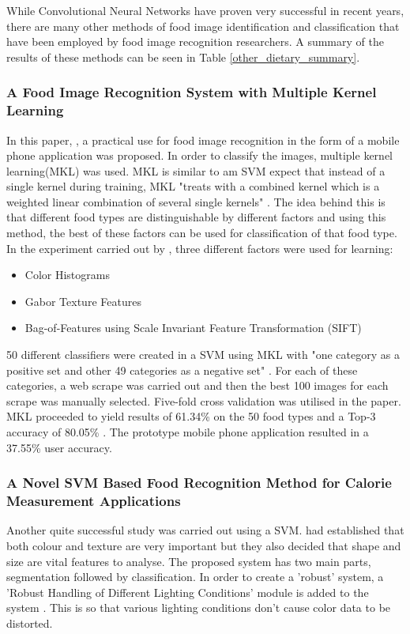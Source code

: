 While Convolutional Neural Networks have proven very successful in recent years, there are many other methods of food image identification and classification that have been employed by food image recognition researchers.
A summary of the results of these methods can be seen in Table \ref{other_dietary_summary}.

\subsubsection*{A Food Image Recognition System with Multiple Kernel Learning}
In this paper, \textcite{kernelLearning}, a practical use for food image recognition in the form of a mobile phone application was proposed. In order to classify the images, multiple kernel learning(MKL) was used. MKL is similar to am SVM expect that instead of a single kernel during training, MKL "treats with a combined kernel which is a weighted linear combination of several single kernels" \textcite{kernelLearning}. The idea behind this is that different food types are distinguishable by different factors and using this method, the best of these factors can be used for classification of that food type. In the experiment carried out by \textcite{kernelLearning}, three different factors were used for learning:
\begin{itemize}
	\item{Color Histograms}
	\item{Gabor Texture Features}
	\item{Bag-of-Features using Scale Invariant Feature Transformation (SIFT)}
\end{itemize}

50 different classifiers were created in a SVM using MKL with "one category as a positive set and other 49 categories as a negative set" \textcite{kernelLearning}. For each of these categories, a web scrape was carried out and then the best 100 images for each scrape was manually selected. Five-fold cross validation was utilised in the paper. MKL proceeded to yield results of 61.34\% on the 50 food types and a Top-3 accuracy of 80.05\% \textcite{kernelLearning}. The prototype mobile phone application resulted in a 37.55\% user accuracy.

\subsubsection*{A Novel SVM Based Food Recognition Method for Calorie Measurement Applications}
Another quite successful study was carried out using a SVM. \textcite{novelSVM} had established that both colour and texture are very important but they also decided that shape and size are vital features to analyse. The proposed system has two main parts, segmentation followed by classification. In order to create a 'robust' system, a 'Robust Handling of Different Lighting Conditions' module is added to the system \textcite{novelSVM}. This is so that various lighting conditions don't cause color data to be distorted. 

